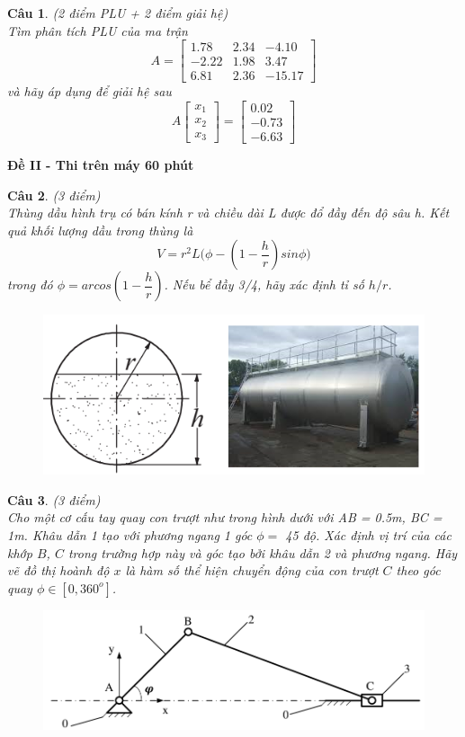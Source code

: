 \documentclass[11pt]{article}
\newtheorem{bt}{Câu}
\newcommand{\m}[1]{
	\begin{bmatrix}
		#1
	\end{bmatrix}
}
\begin{document}
\begin{bt}(2 điểm PLU + 2 điểm giải hệ) \\
Tìm phân tích PLU của ma trận 
\[
A = \m{1.78 & 2.34 & -4.10 \\
	   -2.22 & 1.98  & 3.47 \\
	  6.81 & 2.36  & -15.17}
\]
và hãy áp dụng để giải hệ sau
%
\[
A \m{x_1 \\ x_2 \\ x_3} = \m{0.02 \\ -0.73 \\ -6.63}
\]
%
\end{bt}
\cleardoublepage

\begin{center}	
	\textbf{ Đề II - Thi trên máy 60 phút}
\end{center}

\begin{bt}(3 điểm) \\ %
	Thùng dầu hình trụ có bán kính r và chiều dài L được đổ đầy đến độ sâu h. Kết quả
	khối lượng dầu trong thùng là
	\[
	V = r^2L \Big( \phi - \left(1 - \dfrac{h}{r}\right) sin \phi \Big)
	\]
	trong đó $\phi = arcos\left(1 - \dfrac{h}{r}\right)$. Nếu bể đầy 3/4, hãy xác định tỉ số $h/r$.
	
	\begin{figure}[h!]
		\centering
		\includegraphics[width=0.7\linewidth]{oil_tank}
		\caption{}
		\label{fig:oiltank}
	\end{figure}
\end{bt}


\begin{bt}(3 điểm) \\
Cho một cơ cấu tay quay con trượt như trong hình dưới với AB = 0.5m, BC = 1m. Khâu dẫn 1 tạo với phương ngang 1 góc $\phi = $ 45 độ. Xác định vị trí của các khớp $B$, $C$ trong trường hợp này và góc tạo bởi khâu dẫn 2 và phương ngang. 
Hãy vẽ đồ thị hoành độ $x$ là hàm số thể hiện chuyển động của con trượt $C$ theo góc quay $\phi \in [0,360^o]$.
\begin{figure}[h!]
	\centering
	\includegraphics[width=0.7\linewidth]{tay_quay}
	\caption{}
	\label{fig:tayquay}
\end{figure}
\end{bt}
\end{document}
